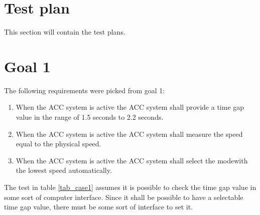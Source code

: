 \section{Test plan}
This section will contain the test plans. 

\section{Goal 1}

The following requirements were picked from goal 1:

\begin{enumerate}
    \item When the ACC system is active the ACC system shall provide a time gap value in the range of 1.5 seconds to 2.2 seconds.
    \item When the ACC system is active the ACC system shall measure the speed equal to the physical speed.
    \item When the ACC system is active the ACC system shall select the modewith the lowest speed automatically.
\end{enumerate}

\noindent The test in table \ref{tab_case1} assumes it is possible to check the time gap value in some sort of computer interface. Since it shall be possible to have a selectable time gap value, there must be some sort of interface to set it. 
 
